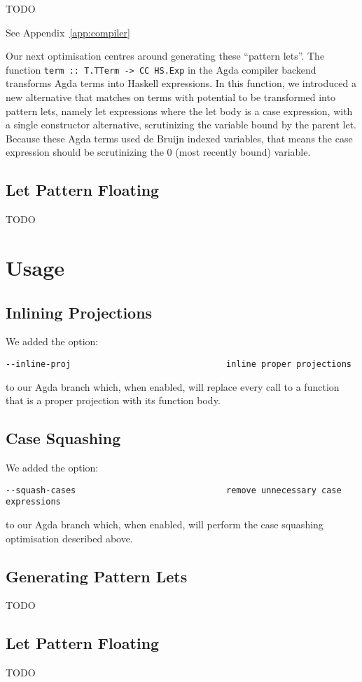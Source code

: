 TODO

See Appendix~\ref{app:compiler}

Our next optimisation centres around generating these ``pattern lets''. The function \lstinline{term :: T.TTerm -> CC HS.Exp} in the Agda compiler backend transforms Agda terms into Haskell expressions. In this function, we introduced a new alternative that matches on terms with potential to be transformed into pattern lets, namely let expressions where the let body is a case expression, with a single constructor alternative, scrutinizing the variable bound by the parent let. Because these Agda terms used de Bruijn indexed variables, that means the case expression should be scrutinizing the 0 (most recently bound) variable.

\subsection{Let Pattern Floating}

TODO

\section{Usage}
\label{sec:usage}

\subsection{Inlining Projections}

We added the option:

\begin{verbatim}
--inline-proj                               inline proper projections
\end{verbatim}

to our Agda branch which, when enabled, will replace every call to a function that is a proper projection with its function body. 

\subsection{Case Squashing}

We added the option:

\begin{verbatim}
--squash-cases                              remove unnecessary case expressions
\end{verbatim}

to our Agda branch which, when enabled, will perform the case squashing optimisation described above.

\subsection{Generating Pattern Lets}

TODO

\subsection{Let Pattern Floating}

TODO
